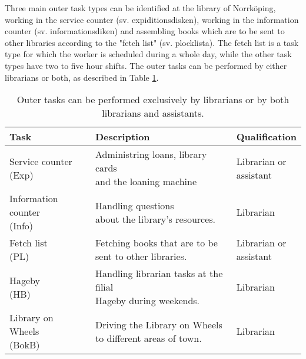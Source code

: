 Three main outer task types can be identified at the library of Norrköping, working in the service counter (sv. expiditionsdisken), working in the information counter (sv. informationsdiken)  and assembling books which are to be sent to other libraries according to the "fetch list" (sv. plocklista). The fetch list is a task type for which the worker is scheduled during a whole day, while the other task types have two to five hour shifts. The outer tasks can be performed by either librarians or both, as described in Table \ref{tab:Outer_Tasks}.

\begin{table}[h]
\centering
\caption{Outer tasks can be performed exclusively by librarians or by both librarians and assistants.}
\label{tab:Outer_Tasks}
\begin{tabularx}{\textwidth}{|l|l|X|}
\hline
\textbf{Task} & \textbf{Description} & \textbf{Qualification}\\ \hline 
\specialcell[t]{Service counter \\ (Exp)}  & \specialcell[t]{Administring loans, library cards\\ and the loaning machine} & \specialcell[t]{Librarian or \\  assistant} 
\\ \hline
\specialcell[t]{Information counter \\ (Info)} & \specialcell[t]{Handling questions \\about the library's resources.} & Librarian
\\ \hline 
\specialcell[t]{Fetch list \\(PL)} & \specialcell[t]{Fetching books that are to be \\sent to other libraries.} & \specialcell[t]{Librarian  or \\  assistant}
\\ \hline 
\specialcell[t]{Hageby \\(HB)} & \specialcell[t]{Handling librarian tasks at the filial \\ Hageby during weekends.} & Librarian
\\ \hline 
\specialcell[t]{Library on Wheels \\(BokB)} & \specialcell[t]{Driving the Library on Wheels \\ to different areas of town.} & Librarian
\\ \hline 
\end{tabularx}
\end{table} 

